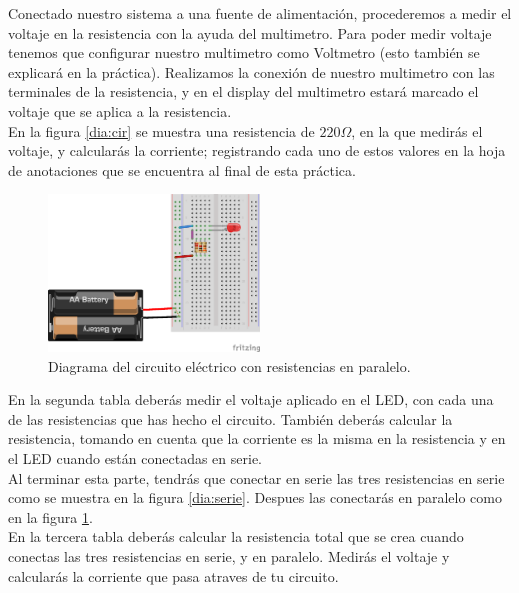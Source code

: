     Conectado nuestro sistema a una fuente de alimentación, procederemos a medir el voltaje en la resistencia con la ayuda del multimetro. Para poder medir voltaje tenemos que configurar nuestro multimetro como Voltmetro (esto también se explicará en la práctica). Realizamos la conexión de nuestro multimetro con las terminales de la resistencia, y en el display del multimetro estará marcado el voltaje que se aplica a la resistencia. \\

    En la figura \ref{dia:cir} se muestra una resistencia de $220 \Omega$, en la que medirás el voltaje, y calcularás la corriente; registrando cada uno de estos valores en la hoja de anotaciones que se encuentra al final de esta práctica. \\

    \begin{figure}[h]
    	\begin{center}
    		\includegraphics[width=0.5\textwidth]{images/LED-bateria-resistencias-paralelo.png}
    		\caption{Diagrama del circuito eléctrico con resistencias en paralelo.}
    		\label{dia:paralelo}
    	\end{center}
    \end{figure}

    En la segunda tabla deberás medir el voltaje aplicado en el LED, con cada una de las resistencias que has hecho el circuito. También deberás calcular la resistencia, tomando en cuenta que la corriente es la misma en la resistencia y en el LED cuando están conectadas en serie. \\

    Al terminar esta parte, tendrás que conectar en serie las tres resistencias en serie como se muestra en la figura \ref{dia:serie}. Despues las conectarás en paralelo como en la figura \ref{dia:paralelo}. \\

    En la tercera tabla deberás calcular la resistencia total que se crea cuando conectas las tres resistencias en serie, y en paralelo. Medirás el voltaje y calcularás la corriente que pasa atraves de tu circuito.

